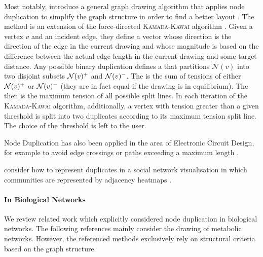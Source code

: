 \documentclass[
	fontsize=10pt, %
	twoside=false, %
	secnumdepth=1, %
  toc=indentunnumbered %
]{kaobook}
\begin{document}
Most notably, \citeauthor{eades_VertexSplittingTensionfree_1996} introduce a
general graph drawing algorithm that applies node duplication to simplify the
graph structure in order to find a better layout
\cite{eades_VertexSplittingTensionfree_1996}. The method is an extension of the
force-directed \textsc{Kamada-Kawai} algorithm
\cite{kamada_AlgorithmDrawingGeneral_1989}. Given a vertex $v$ and an incident
edge, they define a  vector whose direction is the direction of the
edge in the current drawing and whose magnitude is based on the difference
between the actual edge length in the current drawing and some target distance.
Any possible binary duplication defines a  that partitions
$\mathcal{N}(v)$ into two disjoint subsets $\mathcal{N}(v)^+$ and $\mathcal{N}(v)^-$.
The  is the sum of tensions of either
$\mathcal{N}(v)^+$ or $\mathcal{N}(v)^-$ (they are in fact equal if the drawing is
in equilibrium). The  then is the maximum tension of all
possible split lines. In each iteration of the \textsc{Kamada-Kawai} algorithm,
additionally, a vertex with tension greater than a given threshold is split
into two duplicates according to its maximum tension split line. The choice of
the threshold is left to the user.

Node Duplication has also been applied in the area of Electronic Circuit Design,
for example to avoid edge crossings \cite{li_EliminateWireCrossings_2008} or
paths exceeding a maximum length
\cite{paik_VertexSplittingDags_1998, mayer_GeneticAlgorithmsVertex_1993}.

\citeauthor{henr_ImprovingReadabilityClustered_2008}
 consider how to represent
duplicates in a social network visualisation in which communities are
represented by adjacency heatmaps
\cite{henr_ImprovingReadabilityClustered_2008}.


\paragraph{In Biological Networks} We review related work which explicitly
considered node duplication in biological networks. The following references
mainly consider the drawing of metabolic networks. However, the referenced
methods exclusively rely on structural criteria based on the graph structure.

\end{document}
